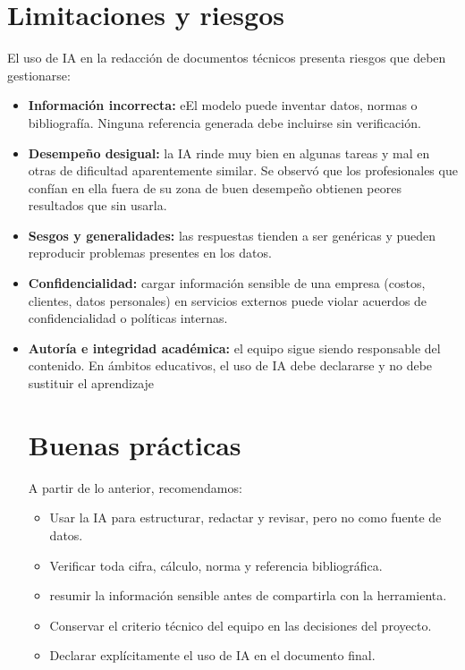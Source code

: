 \documentclass[runningheads]{llncs}
\begin{document}
\section{Limitaciones y riesgos}

El uso de IA en la redacción de documentos técnicos presenta riesgos que deben gestionarse:

\begin{itemize}
\item \textbf{Información incorrecta:} eEl modelo puede inventar datos, normas o bibliografía. Ninguna referencia generada debe incluirse sin verificación.
\item \textbf{Desempeño desigual:} la IA rinde muy bien en algunas tareas y  mal en otras de dificultad aparentemente similar. Se observó que los profesionales que confían en ella fuera de su zona de buen desempeño obtienen peores resultados que sin usarla.
\item \textbf{Sesgos y generalidades:} las respuestas tienden a ser genéricas y pueden reproducir problemas presentes en los datos.
\item \textbf{Confidencialidad:} cargar información sensible de una empresa (costos, clientes, datos personales) en servicios externos puede violar acuerdos de confidencialidad o políticas internas.
\item \textbf{Autoría e integridad académica:} el equipo sigue siendo responsable del contenido. En ámbitos educativos, el uso de IA debe declararse y no debe sustituir el aprendizaje 

\section{Buenas prácticas}

A partir de lo anterior, recomendamos:

\begin{itemize}
\item Usar la IA para estructurar, redactar y revisar, pero no como fuente de datos.
\item Verificar toda cifra, cálculo, norma y referencia bibliográfica.
\item resumir la información sensible antes de compartirla con la herramienta.
\item Conservar el criterio técnico del equipo en las decisiones del proyecto.
\item Declarar explícitamente el uso de IA en el documento final.
\end{itemize}


\end{itemize}
\end{document}
